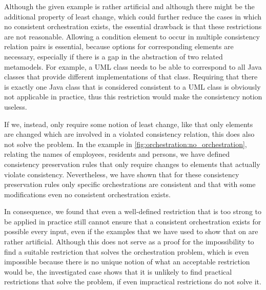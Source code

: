 Although the given example is rather artificial and although there might be the additional property of least change, which could further reduce the cases in which no consistent orchestration exists, the essential drawback is that these restrictions are not reasonable.
Allowing a condition element to occur in multiple consistency relation pairs is essential, because options for corresponding elements are necessary, especially if there is a gap in the abstraction of two related metamodels.
For example, a \gls{UML} class needs to be able to correspond to all Java classes that provide different implementations of that class.
Requiring that there is exactly one Java class that is considered consistent to a \gls{UML} class is obviously not applicable in practice, thus this restriction would make the consistency notion useless.

If we, instead, only require some notion of least change, like that only elements are changed which are involved in a violated consistency relation, this does also not solve the problem.
In the example in \autoref{fig:orchestration:no_orchestration}, relating the names of employees, residents and persons, we have defined consistency preservation rules that only require changes to elements that actually violate consistency.
Nevertheless, we have shown that for these consistency preservation rules only specific orchestrations are consistent and that with some modifications even no consistent orchestration exists.

In consequence, we found that even a well-defined restriction that is too strong to be applied in practice still cannot ensure that a consistent orchestration exists for possible every input, even if the examples that we have used to show that on are rather artificial.
Although this does not serve as a proof for the impossibility to find a suitable restriction that solves the orchestration problem, which is even impossible because there is no unique notion of what an acceptable restriction would be, the investigated case shows that it is unlikely to find practical restrictions that solve the problem, if even impractical restrictions do not solve it.


